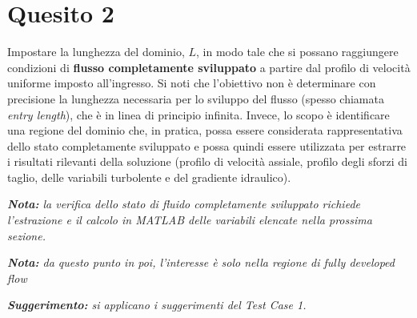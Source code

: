 
\section{Quesito 2}

Impostare la lunghezza del dominio, $L$, in modo tale che si possano raggiungere condizioni di \textbf{flusso completamente sviluppato} a partire dal profilo di velocità uniforme imposto all'ingresso. Si noti che l'obiettivo non è determinare con precisione la lunghezza necessaria per lo sviluppo del flusso (spesso chiamata \emph{entry length}), che è in linea di principio infinita. Invece, lo scopo è identificare una regione del dominio che, in pratica, possa essere considerata rappresentativa dello stato completamente sviluppato e possa quindi essere utilizzata per estrarre i risultati rilevanti della soluzione (profilo di velocità assiale, profilo degli sforzi di taglio, delle variabili turbolente e del gradiente idraulico).

\vspace{0.3em}
    
\emph{\textbf{Nota:} la verifica dello stato di fluido completamente sviluppato richiede l'estrazione e il calcolo in MATLAB delle variabili elencate nella prossima sezione.}

\vspace{0.3em}
    
\emph{\textbf{Nota:} da questo punto in poi, l'interesse è solo nella regione di fully developed flow}

\vspace{0.3em}
    
\emph{\textbf{Suggerimento:} si applicano i suggerimenti del Test Case 1.}


